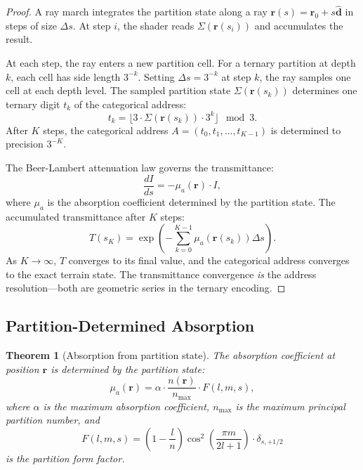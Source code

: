 \documentclass[10pt,twocolumn]{article}
\newtheorem{theorem}{Theorem}[section]
\theoremstyle{definition}
\theoremstyle{remark}
\begin{document}
\begin{proof}
A ray march integrates the partition state along a ray
$\mathbf{r}(s)=\mathbf{r}_0+s\hat{\mathbf{d}}$ in steps of
size $\Delta s$.  At step $i$, the shader reads
$\Sigma(\mathbf{r}(s_i))$ and accumulates the result.

At each step, the ray enters a new partition cell.  For a
ternary partition at depth $k$, each cell has side length
$3^{-k}$.  Setting $\Delta s = 3^{-k}$ at step $k$, the ray
samples one cell at each depth level.  The sampled partition
state $\Sigma(\mathbf{r}(s_k))$ determines one ternary digit
$t_k$ of the categorical address:
\begin{equation}
  t_k = \lfloor 3\cdot\Sigma(\mathbf{r}(s_k))\cdot 3^k
  \rfloor \mod 3.
\end{equation}
After $K$ steps, the categorical address
$A=(t_0,t_1,\dots,t_{K-1})$ is determined to precision
$3^{-K}$.

The Beer-Lambert attenuation law \citep{Beer1852,Lambert1760}
governs the transmittance:
\begin{equation}\label{eq:beer}
  \frac{dI}{ds} = -\mu_a(\mathbf{r})\cdot I,
\end{equation}
where $\mu_a$ is the absorption coefficient determined by the
partition state.  The accumulated transmittance after $K$
steps:
\begin{equation}\label{eq:transmittance}
  T(s_K) = \exp\!\left(-\sum_{k=0}^{K-1}\mu_a(\mathbf{r}(s_k))
  \Delta s\right).
\end{equation}
As $K\to\infty$, $T$ converges to its final value, and the
categorical address converges to the exact terrain state.
The transmittance convergence \emph{is} the address
resolution---both are geometric series in the ternary encoding.
\end{proof}

\subsection{Partition-Determined Absorption}
\label{sec:absorption}

\begin{theorem}[Absorption from partition state]
\label{thm:absorption}
The absorption coefficient at position $\mathbf{r}$ is
determined by the partition state:
\begin{equation}\label{eq:mu_a}
  \mu_a(\mathbf{r}) = \alpha\cdot\frac{n(\mathbf{r})}{n_{\max}}
  \cdot F(l,m,s),
\end{equation}
where $\alpha$ is the maximum absorption coefficient,
$n_{\max}$ is the maximum principal partition number, and
\begin{equation}\label{eq:F}
  F(l,m,s) = \left(1-\frac{l}{n}\right)
  \cos^2\!\left(\frac{\pi m}{2l+1}\right)
  \cdot\delta_{s,+1/2}
\end{equation}
is the partition form factor.
\end{theorem}
\end{document}
